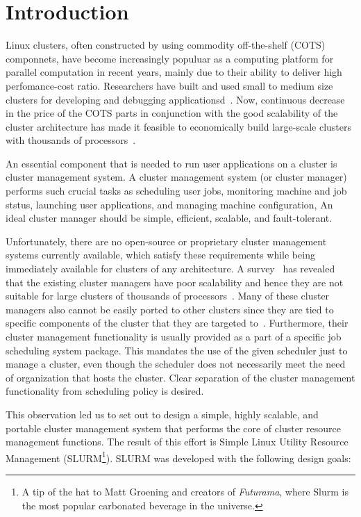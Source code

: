 \section{Introduction}
Linux clusters, often constructed by using commodity off-the-shelf (COTS) componnets,
have become increasingly populuar as a computing platform for parallel computation
in recent years, mainly due to their ability to deliver high perfomance-cost ratio.
Researchers have built and used small to medium size clusters for developing and debugging
applicationsd~\cite{BeowulfWeb,LokiWeb}.
Now, continuous decrease in the price of the COTS parts  in conjunction with
the good scalability of the cluster architecture has made it feasible to economically
build large-scale clusters with thousands of processors~\cite{MCRWeb,PCRWeb}.

An essential component that is needed to 
run user applications on a cluster is cluster management system.
A cluster management system (or cluster manager) performs such crucial tasks as
scheduling user jobs, monitoring machine and job ststus, launching user applications, and
managing machine configuration,
An ideal cluster manager should be simple, efficient, scalable, and fault-tolerant.

Unfortunately, there are no open-source or proprietary cluster management systems currently available, 
which satisfy these requirements while being immediately available for clusters of any architecture. 
A survey~\cite{Jette02} has revealed that the existing cluster managers have poor scalability and hence 
they are not suitable for large clusters of thousands of 
processors~\cite{LoadLevelerWeb,LoadLevelerManual}.
Many of these cluster managers also cannot be easily ported to other clusters since they are 
tied to specific components of the cluster that they are 
targeted to~\cite{RMS,LoadLevelerWeb,LoadLevelerManual}. 
Furthermore, their cluster management functionality is usually provided as a part of a specific 
job scheduling system package. 
This mandates the use of the given scheduler just to manage a cluster, 
even though the scheduler does not necessarily meet the need of organization that hosts the cluster.
Clear separation of the cluster management functionality from scheduling policy is desired.

This observation led us to set out to design a simple, highly scalable, and 
portable cluster management system that performs the core of cluster resource management functions. 
The result of this effort is Simple Linux Utility Resource Management 
(SLURM\footnote{A tip of the hat to Matt Groening and creators of {\em Futurama},
where Slurm is the most popular carbonated beverage in the universe.}). 
SLURM was developed with the following design goals:

